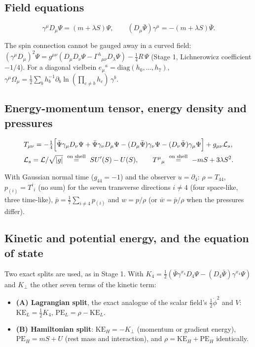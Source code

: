 \documentclass[11pt]{article}
\begin{document}
\subsection{Field equations}

\[
\gamma^\mu D_\mu\Psi=(m+\lambda S)\Psi,\qquad (D_\mu\bar\Psi)\gamma^\mu=-(m+\lambda S)\bar\Psi .
\]

The spin connection cannot be gauged away in a curved field: $(\gamma^\mu D_\mu)^2\Psi=g^{\mu\nu}(D_\mu D_\nu\Psi-\Gamma^\lambda{}_{\mu\nu}D_\lambda\Psi)-\tfrac14R\,\Psi$ (Stage 1, Lichnerowicz coefficient $-1/4$). For a diagonal vielbein $e_\mu{}^a=\mathrm{diag}(h_0,\dots,h_7)$, $\gamma^\mu\Omega_\mu=\tfrac12\sum_b h_b^{-1}\partial_b\ln(\prod_{c\ne b}h_c)\,\gamma^b$.

\subsection{Energy-momentum tensor, energy density and pressures}

\[
\begin{aligned}
&T_{\mu\nu}=-\tfrac14\Bigl[\bar\Psi\gamma_\mu D_\nu\Psi+\bar\Psi\gamma_\nu D_\mu\Psi-(D_\mu\bar\Psi)\gamma_\nu\Psi-(D_\nu\bar\Psi)\gamma_\mu\Psi\Bigr]+g_{\mu\nu}\mathcal L_s,\\
&\mathcal L_s=\mathcal L/\sqrt{|g|}\ \overset{\text{on shell}}{=}\ SU'(S)-U(S),\qquad T^\mu{}_\mu\ \overset{\text{on shell}}{=}\ -mS+3\lambda S^2 .
\end{aligned}
\]

With Gaussian normal time ($g_{44}=-1$) and the observer $u=\partial_4$: $\rho=T_{44}$, $p_{(i)}=T^i{}_i$ (no sum) for the seven transverse directions $i\ne4$ (four space-like, three time-like), $\bar p=\tfrac17\sum_{i\ne4}p_{(i)}$ and $w=p/\rho$ (or $\bar w=\bar p/\rho$ when the pressures differ).

\subsection{Kinetic and potential energy, and the equation of state}

Two exact splits are used, as in Stage 1. With $K_4=\tfrac12(\bar\Psi\gamma^{x_4}D_4\Psi-(D_4\bar\Psi)\gamma^{x_4}\Psi)$ and $K_\perp$ the other seven terms of the kinetic term:

\begin{itemize}
\item \textbf{(A) Lagrangian split}, the exact analogue of the scalar field's $\tfrac12\dot\phi^2$ and $V$: $\mathrm{KE}_L=\tfrac12K_4$, $\mathrm{PE}_L=\rho-\mathrm{KE}_L$.
\item \textbf{(B) Hamiltonian split}: $\mathrm{KE}_H=-K_\perp$ (momentum or gradient energy), $\mathrm{PE}_H=mS+U$ (rest mass and interaction), and $\rho=\mathrm{KE}_H+\mathrm{PE}_H$ identically.
\end{itemize}
\end{document}
